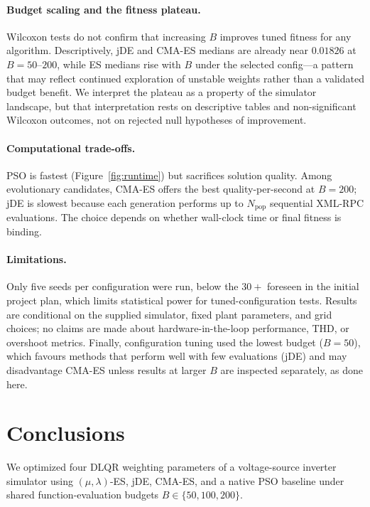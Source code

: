 \documentclass[pdflatex,sn-mathphys-num]{sn-jnl}
\begin{document}
\paragraph{Budget scaling and the fitness plateau.}
Wilcoxon tests do not confirm that increasing $B$ improves tuned fitness for any algorithm.
Descriptively, jDE and CMA-ES medians are already near $0.01826$ at $B=50$--$200$, while ES medians rise with $B$ under the selected config---a pattern that may reflect continued exploration of unstable weights rather than a validated budget benefit.
We interpret the plateau as a property of the simulator landscape, but that interpretation rests on descriptive tables and non-significant Wilcoxon outcomes, not on rejected null hypotheses of improvement.

\paragraph{Computational trade-offs.}
PSO is fastest (Figure~\ref{fig:runtime}) but sacrifices solution quality.
Among evolutionary candidates, CMA-ES offers the best quality-per-second at $B=200$; jDE is slowest because each generation performs up to $N_{\mathrm{pop}}$ sequential XML-RPC evaluations.
The choice depends on whether wall-clock time or final fitness is binding.

\paragraph{Limitations.}
Only five seeds per configuration were run, below the $30+$ foreseen in the initial project plan, which limits statistical power for tuned-configuration tests.
Results are conditional on the supplied simulator, fixed plant parameters, and grid choices; no claims are made about hardware-in-the-loop performance, THD, or overshoot metrics.
Finally, configuration tuning used the lowest budget ($B=50$), which favours methods that perform well with few evaluations (jDE) and may disadvantage CMA-ES unless results at larger $B$ are inspected separately, as done here.

\section{Conclusions}\label{sec:conclusions}

We optimized four DLQR weighting parameters of a voltage-source inverter simulator using $(\mu,\lambda)$-ES, jDE, CMA-ES, and a native PSO baseline under shared function-evaluation budgets $B\in\{50,100,200\}$.
\end{document}
